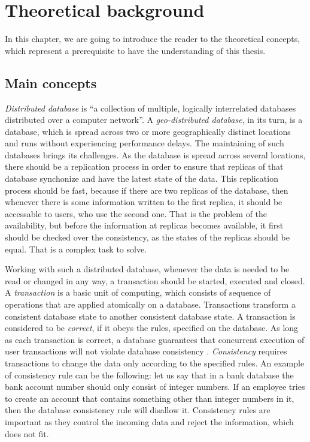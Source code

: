 \chapter{Theoretical background}
\label{Background}

In this chapter, we are going to introduce the reader to the theoretical concepts, which represent a prerequisite to have the understanding of this thesis.

\section{Main concepts}

\textit{Distributed database} is ``a collection of multiple, logically interrelated databases distributed over a computer network''\cite{11}. A \textit{geo-distributed database}, in its turn, is a database, which is spread across two or more geographically distinct locations and runs without experiencing performance delays. The maintaining of such databases brings its challenges. As the database is spread across several locations, there should be a replication process in order to ensure that replicas of that database synchonize and have the latest state of the data. This replication process should be fast, because if there are two replicas of the database, then whenever there is some information written to the first replica, it should be accessable to users, who use the second one. That is the problem of the availability, but before the information at replicas becomes available, it first should be checked over the consistency, as the states of the replicas should be equal. That is a complex task to solve. 

Working with such a distributed database, whenever the data is needed to be read or changed in any way, a transaction should be started, executed and closed. A \textit{transaction} is a basic unit of computing, which consists of sequence of operations that are applied atomically on a database. Transactions transform a consistent database state to another consistent database state. A transaction is considered to be \textit{correct}, if it obeys the rules, specified on the database. As long as each transaction is correct, a database guarantees that concurrent execution of user transactions will not violate database consistency \cite{11}. \textit{Consistency} requires transactions to change the data only according to the specified rules. An example of consistency rule can be the following: let us say that in a bank database the bank account number should only consist of integer numbers. If an employee tries to create an account that contains something other than integer numbers in it, then the database consistency rule will disallow it. Consistency rules are important as they control the incoming data and reject the information, which does not fit.

